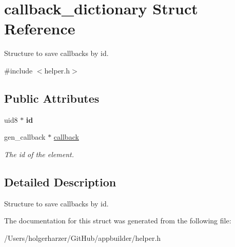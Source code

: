 \hypertarget{structcallback__dictionary}{\section{callback\+\_\+dictionary Struct Reference}
\label{structcallback__dictionary}
}


Structure to save callbacks by id.  




{\ttfamily \#include $<$helper.\+h$>$}

\subsection*{Public Attributes}
\begin{DoxyCompactItemize}
\item 
\hypertarget{structcallback__dictionary_a187a4d00861c73b3b963f4d2aee346a5}{uid8 $\ast$ {\bfseries id}}\label{structcallback__dictionary_a187a4d00861c73b3b963f4d2aee346a5}

\item 
\hypertarget{structcallback__dictionary_ae5bf2254961e10c73b9ef12dbab36440}{gen\+\_\+callback $\ast$ \hyperlink{structcallback__dictionary_ae5bf2254961e10c73b9ef12dbab36440}{callback}}\label{structcallback__dictionary_ae5bf2254961e10c73b9ef12dbab36440}

\begin{DoxyCompactList}\small\item\em The id of the element. \end{DoxyCompactList}\end{DoxyCompactItemize}


\subsection{Detailed Description}
Structure to save callbacks by id. 

The documentation for this struct was generated from the following file\+:\begin{DoxyCompactItemize}
\item 
/\+Users/holgerharzer/\+Git\+Hub/appbuilder/helper.\+h\end{DoxyCompactItemize}
